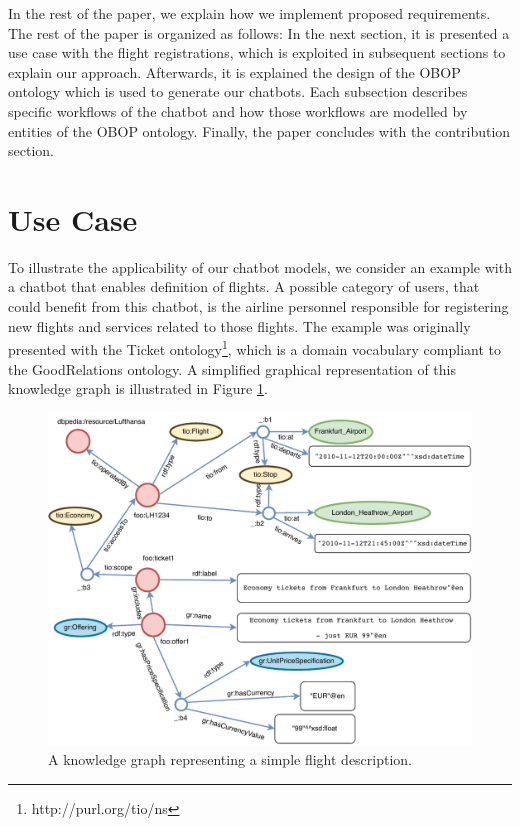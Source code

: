 \documentclass[runningheads]{llncs}
\begin{document}
In the rest of the paper, we explain how we implement proposed requirements.
The rest of the paper is organized as follows: In the next section, it is presented a use case with the flight registrations, which is exploited in subsequent sections to explain our approach. Afterwards, it is explained the design of the OBOP ontology which is used to generate our chatbots. Each subsection describes specific workflows of the chatbot and how those workflows are modelled by entities of the OBOP ontology. Finally, the paper concludes with the contribution section.

\section{Use Case}
To illustrate the applicability of our chatbot models, we consider an example with a chatbot that enables definition of flights. A possible category of users, that could benefit from this chatbot, is the airline personnel responsible for registering new flights and services related to those flights. The example was originally presented with the Ticket ontology\footnote{\label{Ticket Ontology}http://purl.org/tio/ns}, which is a domain vocabulary compliant to the GoodRelations \cite{hepp2008goodrelations} ontology. A simplified graphical representation of this knowledge graph is illustrated in Figure \ref{fig:usecase}.

\begin{figure}[H]
  \centering
  \includegraphics[width=\linewidth]{img/use_case}
  \caption{A knowledge graph representing a simple flight description.}
  \label{fig:usecase}
\end{figure}
\end{document}
